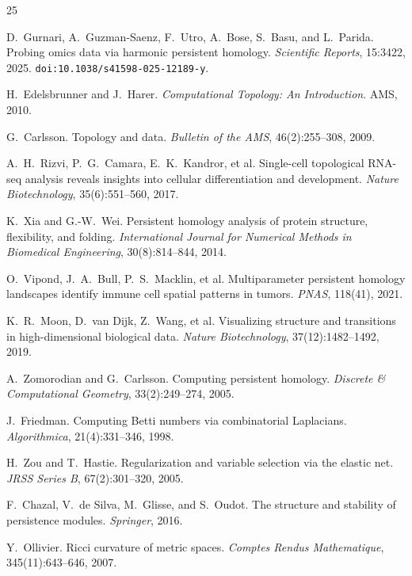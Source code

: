 \documentclass[11pt]{article}
\begin{document}

\begin{thebibliography}{25}

D.~Gurnari, A.~Guzman-Saenz, F.~Utro, A.~Bose, S.~Basu, and L.~Parida.
Probing omics data via harmonic persistent homology.
\emph{Scientific Reports}, 15:3422, 2025.
\texttt{doi:10.1038/s41598-025-12189-y}.

H.~Edelsbrunner and J.~Harer.
\emph{Computational Topology: An Introduction}.
AMS, 2010.

G.~Carlsson.
Topology and data.
\emph{Bulletin of the AMS}, 46(2):255--308, 2009.

A.~H.~Rizvi, P.~G.~Camara, E.~K.~Kandror, et al.
Single-cell topological RNA-seq analysis reveals insights into cellular differentiation and development.
\emph{Nature Biotechnology}, 35(6):551--560, 2017.

K.~Xia and G.-W.~Wei.
Persistent homology analysis of protein structure, flexibility, and folding.
\emph{International Journal for Numerical Methods in Biomedical Engineering}, 30(8):814--844, 2014.

O.~Vipond, J.~A.~Bull, P.~S.~Macklin, et al.
Multiparameter persistent homology landscapes identify immune cell spatial patterns in tumors.
\emph{PNAS}, 118(41), 2021.

K.~R.~Moon, D.~van Dijk, Z.~Wang, et al.
Visualizing structure and transitions in high-dimensional biological data.
\emph{Nature Biotechnology}, 37(12):1482--1492, 2019.

A.~Zomorodian and G.~Carlsson.
Computing persistent homology.
\emph{Discrete \& Computational Geometry}, 33(2):249--274, 2005.

J.~Friedman.
Computing Betti numbers via combinatorial Laplacians.
\emph{Algorithmica}, 21(4):331--346, 1998.

H.~Zou and T.~Hastie.
Regularization and variable selection via the elastic net.
\emph{JRSS Series B}, 67(2):301--320, 2005.

F.~Chazal, V.~de Silva, M.~Glisse, and S.~Oudot.
The structure and stability of persistence modules.
\emph{Springer}, 2016.

Y.~Ollivier.
Ricci curvature of metric spaces.
\emph{Comptes Rendus Mathematique}, 345(11):643--646, 2007.


\end{thebibliography}
\end{document}
